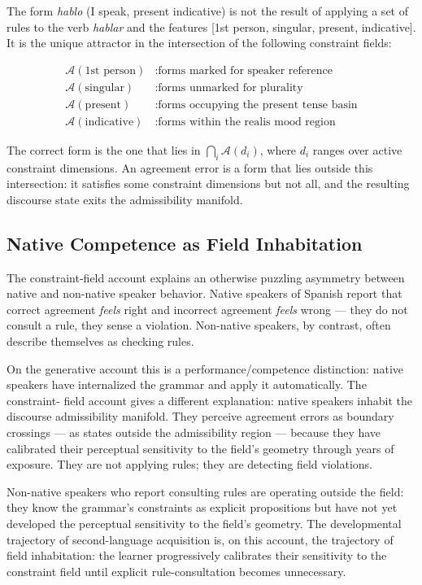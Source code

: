 \documentclass[11pt, a4paper]{article}
\theoremstyle{definition}
\theoremstyle{remark}
\begin{document}
The form \textit{hablo} (I speak, present indicative) is not the result of
applying a set of rules to the verb \textit{hablar} and the features [1st
person, singular, present, indicative]. It is the unique attractor in the
intersection of the following constraint fields:

\begin{align*}
\mathcal{A}(\text{1st person}) &: \text{forms marked for speaker reference} \\
\mathcal{A}(\text{singular}) &: \text{forms unmarked for plurality} \\
\mathcal{A}(\text{present}) &: \text{forms occupying the present tense basin} \\
\mathcal{A}(\text{indicative}) &: \text{forms within the realis mood region}
\end{align*}

The correct form is the one that lies in $\bigcap_i \mathcal{A}(d_i)$, where
$d_i$ ranges over active constraint dimensions. An agreement error is a form
that lies outside this intersection: it satisfies some constraint dimensions
but not all, and the resulting discourse state exits the admissibility manifold.

\subsection{Native Competence as Field Inhabitation}

The constraint-field account explains an otherwise puzzling asymmetry between
native and non-native speaker behavior. Native speakers of Spanish report that
correct agreement \textit{feels} right and incorrect agreement \textit{feels}
wrong --- they do not consult a rule, they sense a violation. Non-native
speakers, by contrast, often describe themselves as checking rules.

On the generative account this is a performance/competence distinction: native
speakers have internalized the grammar and apply it automatically. The constraint-
field account gives a different explanation: native speakers inhabit the discourse
admissibility manifold. They perceive agreement errors as boundary crossings ---
as states outside the admissibility region --- because they have calibrated their
perceptual sensitivity to the field's geometry through years of exposure. They
are not applying rules; they are detecting field violations.

Non-native speakers who report consulting rules are operating outside the field:
they know the grammar's constraints as explicit propositions but have not yet
developed the perceptual sensitivity to the field's geometry. The developmental
trajectory of second-language acquisition is, on this account, the trajectory
of field inhabitation: the learner progressively calibrates their sensitivity
to the constraint field until explicit rule-consultation becomes unnecessary.
\end{document}
